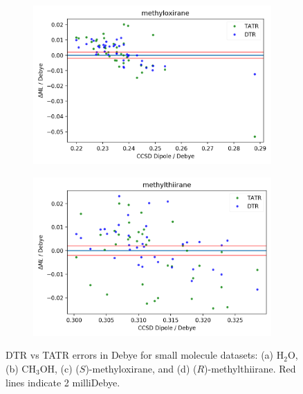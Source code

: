 \begin{figure}
     \begin{subfigure}{.5\textwidth}
         \centering
         \includegraphics[scale=.55]{p2/figures/si/metox_d.png}
         \caption{}
         \label{fig:METOX_D}
     \end{subfigure}%
     \begin{subfigure}{.5\textwidth}
         \centering
         \includegraphics[scale=.55]{p2/figures/si/metthi_d.png}
         \caption{}
         \label{fig:METTHI_D}
     \end{subfigure}
     \caption{DTR vs TATR errors in Debye for small molecule datasets: (a) H$_2$O, (b) CH$_3$OH, (c) ($\textit{S}$)-methyloxirane, and (d) ($\textit{R}$)-methylthiirane. Red lines indicate 2 milliDebye.}
     \label{fig:small-D}
\end{figure}

